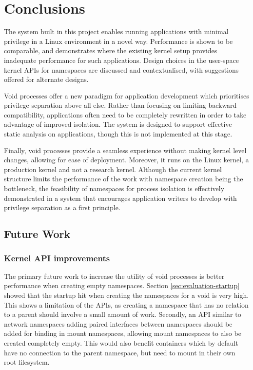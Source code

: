 \documentclass[12pt,a4paper,twoside]{report}
\begin{document}


\chapter{Conclusions}
\label{chap:conclusions}

The system built in this project enables running applications with minimal privilege in a Linux environment in a novel way. Performance is shown to be comparable, and demonstrates where the existing kernel setup provides inadequate performance for such applications. Design choices in the user-space kernel APIs for namespaces are discussed and contextualised, with suggestions offered for alternate designs.

Void processes offer a new paradigm for application development which prioritises privilege separation above all else. Rather than focusing on limiting backward compatibility, applications often need to be completely rewritten in order to take advantage of improved isolation. The system is designed to support effective static analysis on applications, though this is not implemented at this stage.

Finally, void processes provide a seamless experience without making kernel level changes, allowing for ease of deployment. Moreover, it runs on the Linux kernel, a production kernel and not a research kernel. Although the current kernel structure limits the performance of the work with namespace creation being the bottleneck, the feasibility of namespaces for process isolation is effectively demonstrated in a system that encourages application writers to develop with privilege separation as a first principle.

\section{Future Work}
\label{sec:future-work}

\subsection{Kernel API improvements}
\label{sec:future-work-kernel-api}

The primary future work to increase the utility of void processes is better performance when creating empty namespaces. Section \ref{sec:evaluation-startup} showed that the startup hit when creating the namespaces for a void is very high. This shows a limitation of the APIs, as creating a namespace that has no relation to a parent should involve a small amount of work. Secondly, an API similar to network namespaces adding paired interfaces between namespaces should be added for binding in mount namespaces, allowing mount namespaces to also be created completely empty. This would also benefit containers which by default have no connection to the parent namespace, but need to mount in their own root filesystem.
\end{document}

